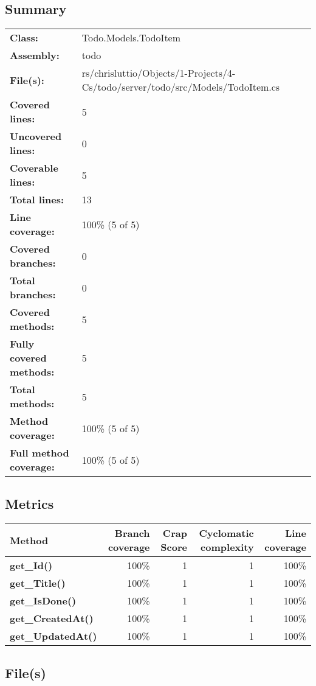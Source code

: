 \documentclass[a4paper,landscape,10pt]{article}
\begin{document}
\subsection{Summary}
\begin{longtable}[l]{ll}
\textbf{Class:} & Todo.Models.TodoItem\\
\textbf{Assembly:} & todo\\
\textbf{File(s):} & \begin{minipage}[t]{12cm}{rs/chrisluttio/Objects/1-Projects/4-Cs/todo/server/todo/src/Models/TodoItem.cs}\end{minipage} \\
\textbf{Covered lines:} & 5\\
\textbf{Uncovered lines:} & 0\\
\textbf{Coverable lines:} & 5\\
\textbf{Total lines:} & 13\\
\textbf{Line coverage:} & 100\% (5 of 5)\\
\textbf{Covered branches:} & 0\\
\textbf{Total branches:} & 0\\
\textbf{Covered methods:} & 5\\
\textbf{Fully covered methods:} & 5\\
\textbf{Total methods:} & 5\\
\textbf{Method coverage:} & 100\% (5 of 5)\\
\textbf{Full method coverage:} & 100\% (5 of 5)\\
\end{longtable}
\subsection{Metrics}
\begin{longtable}[l]{|l|r|r|r|r|}
\hline
\textbf{Method} & \textbf{Branch coverage} & \textbf{Crap Score} & \textbf{Cyclomatic complexity} & \textbf{Line coverage}\\
\hline
\textbf{get\_Id()} & 100\% & 1 & 1 & 100\%\\
\hline
\textbf{get\_Title()} & 100\% & 1 & 1 & 100\%\\
\hline
\textbf{get\_IsDone()} & 100\% & 1 & 1 & 100\%\\
\hline
\textbf{get\_CreatedAt()} & 100\% & 1 & 1 & 100\%\\
\hline
\textbf{get\_UpdatedAt()} & 100\% & 1 & 1 & 100\%\\
\hline
\end{longtable}
\subsection{File(s)}
\end{document}
